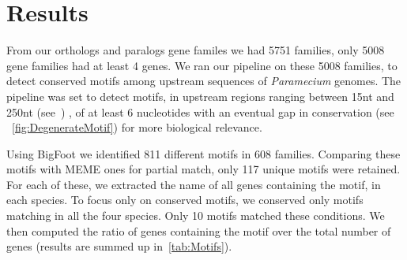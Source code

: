 \section*{Results}
\label{sec:Results}

From our orthologs and paralogs gene familes we had 5751 families, only 5008 gene families had at least 4 genes. We ran our pipeline on these 5008 families, to detect conserved motifs among upstream sequences of \textit{Paramecium} genomes. The pipeline was set to detect motifs, in upstream regions ranging between 15nt and 250nt (see~) , of at least 6 nucleotides with an eventual gap in conservation (see ~\autoref{fig:DegenerateMotif}) for more biological relevance.

Using BigFoot we identified 811 different motifs in 608 families. Comparing these motifs with MEME ones for partial match, only 117 unique motifs were retained. For each of these, we extracted the name of all genes containing the motif, in each species. To focus only on conserved motifs, we conserved only motifs matching in all the four species. Only 10 motifs matched these conditions. We then computed the ratio of genes containing the motif over the total number of genes (results are summed up in~\autoref{tab:Motifs}).